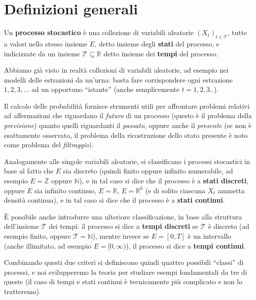 \documentclass[
  italian,
  letterpaper,
]{book}
\newcommand{\R}{\mathbb{R}}
\newcommand{\N}{\mathbb{N}}
\theoremstyle{definition}
\theoremstyle{remark}
\begin{document}
\section{Definizioni generali}\label{sec-definizioni-processi}

Un \textbf{processo stocastico} è una collezione di variabili aleatorie
\((X_t)_{t \in \mathcal{T}}\), tutte a valori nello stesso insieme
\(E\), detto insieme degli \textbf{stati} del processo, e indicizzate da
un insieme \(\mathcal{T} \subseteq \R\) detto insieme dei \textbf{tempi}
del processo.

Abbiamo già visto in realtà collezioni di variabili aleatorie, ad
esempio nei modelli delle estrazioni da un'urna: basta fare
corrispondere ogni estrazione \(1, 2, 3, \ldots\) ad un opportuno
``istante'' (anche semplicemente \(t=1, 2,3..\)).

Il calcolo delle probabilità fornisce strumenti utili per affrontare
problemi relativi ad affermazioni che riguardano il \emph{futuro} di un
processo (questo è il problema della \emph{previsione}) quanto quelli
riguardanti il \emph{passato}, oppure anche il \emph{presente} (se non è
esattamente osservato, il problema della ricostruzione dello stato
presente è noto come problema del \emph{filtraggio}).

Analogamente alle singole variabili aleatorie, si classificano i
processi stocastici in base al fatto che \(E\) sia discreto (quindi
finito oppure infinito numerabile, ad esempio \(E = \mathbb{Z}\) oppure
\(\N\)), e in tal caso si dice che il processo è a \textbf{stati
discreti}, oppure \(E\) sia infinito continuo, \(E = \R\), \(E = \R^k\)
(e di solito ciascuna \(X_t\) ammetta densità continua), e in tal caso
si dice che il processo è a \textbf{stati continui}.

È possibile anche introdurre una ulteriore classificazione, in base alla
struttura dell'insieme \(\mathcal{T}\) dei tempi: il processo si dice a
\textbf{tempi discreti} se \(\mathcal{T}\) è discreto (ad esempio
finito, oppure \(\mathcal{T} = \N\)), mentre invece se \(E = [0,T]\) è
un intervallo (anche illimitato, ad esempio \(E = [0, \infty)\)), il
processo si dice a \textbf{tempi continui}.

Combinando questi due criteri si definiscono quindi quattro possibili
``classi'' di processi, e noi svilupperemo la teoria per studiare esempi
fondamentali da tre di queste (il caso di tempi e stati continui è
tecnicamente più complicato e non lo tratteremo).
\end{document}
